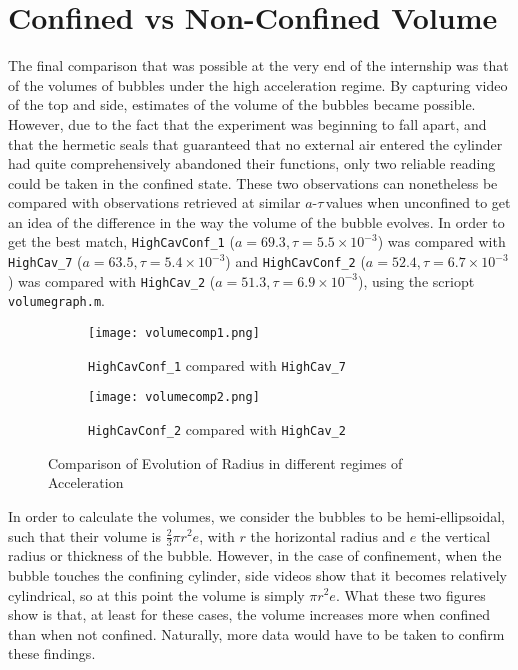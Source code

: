 \documentclass{article}
\newcommand{\at}{$a$-$\tau$\,}
\begin{document}
\section{Confined vs Non-Confined Volume}

The final comparison that was possible at the very end of the internship was that of the volumes of bubbles under the high acceleration regime. By capturing video of the top and side, estimates of the volume of the bubbles became possible. However, due to the fact that the experiment was beginning to fall apart, and that the hermetic seals that guaranteed that no external air entered the cylinder had quite comprehensively abandoned their functions, only two reliable reading could be taken in the confined state. These two observations can nonetheless be compared with observations retrieved at similar \at values when unconfined to get an idea of the difference in the way the volume of the bubble evolves. In order to get the best match, \texttt{HighCavConf\_1} ($a = 69.3, \tau = 5.5 \times 10^{-3}$) was compared with \texttt{HighCav\_7} ($a = 63.5, \tau = 5.4 \times 10^{-3}$) and \texttt{HighCavConf\_2} ($a = 52.4, \tau = 6.7 \times 10^{-3}$) was compared with \texttt{HighCav\_2} ($a = 51.3, \tau = 6.9 \times 10^{-3}$), using the scriopt \texttt{volumegraph.m}.
\begin{figure}[H]
  \centering
  \begin{subfigure}[b]{0.49\linewidth}
    \texttt{[image: volumecomp1.png]}
    \caption{\texttt{HighCavConf\_1} compared with \texttt{HighCav\_7}}
  \end{subfigure}
  \begin{subfigure}[b]{0.49\linewidth}
    \texttt{[image: volumecomp2.png]}
    \caption{\texttt{HighCavConf\_2} compared with \texttt{HighCav\_2}}
  \end{subfigure}
  \caption{Comparison of Evolution of Radius in different regimes of Acceleration}
\end{figure}
In order to calculate the volumes, we consider the bubbles to be hemi-ellipsoidal, such that their volume is $\frac{2}{3}\pi r^2e$, with $r$ the horizontal radius and $e$ the vertical radius or thickness of the bubble. However, in the case of confinement, when the bubble touches the confining cylinder, side videos show that it becomes relatively cylindrical, so at this point the volume is simply $\pi r^2e$. What these two figures show is that, at least for these cases, the volume increases more when confined than when not confined. Naturally, more data would have to be taken to confirm these findings.
\end{document}
